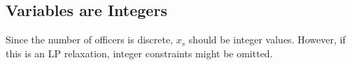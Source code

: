 \documentclass{article}
\begin{document}
\subsection*{Variables are Integers}
Since the number of officers is discrete, \( x_s \) should be integer values. However, if this is an LP relaxation, integer constraints might be omitted.
\end{document}
